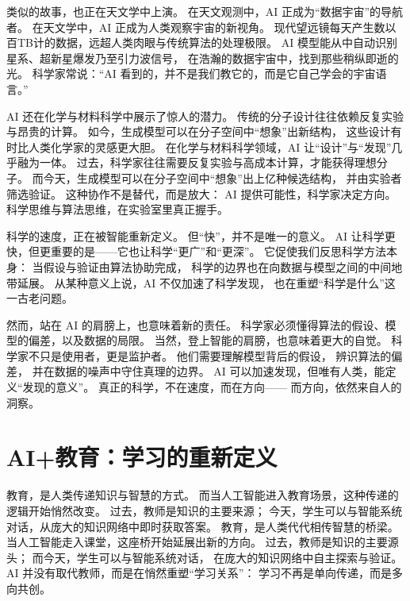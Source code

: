 类似的故事，也正在天文学中上演。  
在天文观测中，AI 正成为“数据宇宙”的导航者。  
在天文学中，AI 正成为人类观察宇宙的新视角。  
现代望远镜每天产生数以百TB计的数据，远超人类肉眼与传统算法的处理极限。  
AI 模型能从中自动识别星系、超新星爆发乃至引力波信号，  
在浩瀚的数据宇宙中，找到那些稍纵即逝的光。  
科学家常说：“AI 看到的，并不是我们教它的，而是它自己学会的宇宙语言。”

AI 还在化学与材料科学中展示了惊人的潜力。  
传统的分子设计往往依赖反复实验与昂贵的计算。  
如今，生成模型可以在分子空间中“想象”出新结构，  
这些设计有时比人类化学家的灵感更大胆。  
在化学与材料科学领域，AI 让“设计”与“发现”几乎融为一体。  
过去，科学家往往需要反复实验与高成本计算，才能获得理想分子。  
而今天，生成模型可以在分子空间中“想象”出上亿种候选结构，  
并由实验者筛选验证。  
这种协作不是替代，而是放大：  
AI 提供可能性，科学家决定方向。  
科学思维与算法思维，在实验室里真正握手。

科学的速度，正在被智能重新定义。  
但“快”，并不是唯一的意义。  
AI 让科学更快，但更重要的是——它也让科学“更广”和“更深”。  
它促使我们反思科学方法本身：  
当假设与验证由算法协助完成，  
科学的边界也在向数据与模型之间的中间地带延展。  
从某种意义上说，AI 不仅加速了科学发现，  
也在重塑“科学是什么”这一古老问题。

然而，站在 AI 的肩膀上，也意味着新的责任。  
科学家必须懂得算法的假设、模型的偏差，以及数据的局限。  
当然，登上智能的肩膀，也意味着更大的自觉。  
科学家不只是使用者，更是监护者。  
他们需要理解模型背后的假设，  
辨识算法的偏差，  
并在数据的噪声中守住真理的边界。  
AI 可以加速发现，但唯有人类，能定义“发现的意义”。  
真正的科学，不在速度，而在方向——  
而方向，依然来自人的洞察。

\section{AI+教育：学习的重新定义}

教育，是人类传递知识与智慧的方式。  
而当人工智能进入教育场景，这种传递的逻辑开始悄然改变。  
过去，教师是知识的主要来源；  
今天，学生可以与智能系统对话，从庞大的知识网络中即时获取答案。  
教育，是人类代代相传智慧的桥梁。  
当人工智能走入课堂，这座桥开始延展出新的方向。  
过去，教师是知识的主要源头；  
而今天，学生可以与智能系统对话，  
在庞大的知识网络中自主探索与验证。  
AI 并没有取代教师，而是在悄然重塑“学习关系”：  
学习不再是单向传递，而是多向共创。

